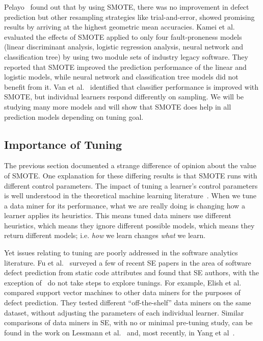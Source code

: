 \documentclass[10pt,conference]{IEEEtran}
\theoremstyle{break}
\theoremstyle{break}
\begin{document}
Pelayo~\cite{pelayo2007applying} found out that by using SMOTE, there was no improvement in defect prediction but other resampling strategies like trial-and-error, showed promising results by arriving at the highest geometric mean accuracies. Kamei et al.~\cite{kamei2007effects} evaluated the effects of SMOTE applied to only four fault-proneness models
(linear discriminant analysis, logistic regression
analysis, neural network and classification tree) by
using two module sets of industry legacy software. They reported that SMOTE improved the prediction performance of the linear and logistic models, while neural network and classification tree models did not
benefit from it. Van et al.~\cite{van2007experimental} identified that classifier performance is improved with SMOTE, but individual learners respond differently on sampling. We will be studying many more models and will show that SMOTE does help in all prediction models depending on tuning goal.

\subsection{Importance of Tuning}
\label{sect:tune}

The previous section documented a strange difference of opinion
about the value of SMOTE. One explanation for these differing results 
is that SMOTE runs with different control parameters.
The impact of tuning a learner's control parameters is well understood in the theoretical machine learning literature~\cite{bergstra2012random}.  When we tune a
data miner for its performance, what we are really doing is changing how a learner applies its
heuristics. This means tuned data miners use different heuristics, which means
they ignore different possible models, which means they return different models;
i.e. \textit{how} we learn changes \textit{what} we learn.

Yet issues relating to
tuning are poorly addressed in the software analytics literature. Fu et al.~\cite{fu2016tuning} surveyed a few of recent SE papers in the area
of software defect prediction from static code attributes and found that SE
  authors, with the exception of~\cite{tantithamthavorn2016icse} do not take steps to explore tunings. For example, Elish et
  al.~\cite{elish2008predicting} compared support vector machines to other data
  miners for the purposes of defect prediction. They tested different
  ``off-the-shelf'' data miners on the same dataset, without adjusting the
  parameters of each individual learner. Similar comparisons of data miners in SE,
with no or minimal pre-tuning study, can be found in the work on Lessmann et al.~\cite{4527256}
and, most recently, in Yang et al~\cite{Yang:2016}.  
\end{document}
